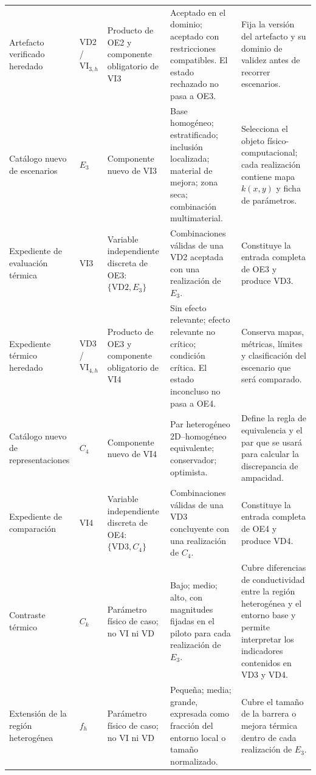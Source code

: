 \documentclass[11pt,a4paper,oneside]{report}
\newcommand{\kx}{k(x,y)}
\begin{document}
\begin{singlespace}
\begin{landscape}
\begin{longtable}{L{3.10cm}L{1.45cm}L{3.00cm}L{5.15cm}L{5.25cm}}
\bottomrule
\endlastfoot

Artefacto verificado heredado & VD2 / $\mathrm{VI}_{3,h}$ & Producto de OE2 y componente obligatorio de VI3 & Aceptado en el dominio; aceptado con restricciones compatibles. El estado rechazado no pasa a OE3. & Fija la versión del artefacto y su dominio de validez antes de recorrer escenarios. \\

Catálogo nuevo de escenarios & $E_3$ & Componente nuevo de VI3 & Base homogéneo; estratificado; inclusión localizada; material de mejora; zona seca; combinación multimaterial. & Selecciona el objeto físico-computacional; cada realización contiene mapa $\kx$ y ficha de parámetros. \\

Expediente de evaluación térmica & VI3 & Variable independiente discreta de OE3: $\{\mathrm{VD2},E_3\}$ & Combinaciones válidas de una VD2 aceptada con una realización de $E_3$. & Constituye la entrada completa de OE3 y produce VD3. \\

Expediente térmico heredado & VD3 / $\mathrm{VI}_{4,h}$ & Producto de OE3 y componente obligatorio de VI4 & Sin efecto relevante; efecto relevante no crítico; condición crítica. El estado inconcluso no pasa a OE4. & Conserva mapas, métricas, límites y clasificación del escenario que será comparado. \\

Catálogo nuevo de representaciones & $C_4$ & Componente nuevo de VI4 & Par heterogéneo 2D--homogéneo equivalente; conservador; optimista. & Define la regla de equivalencia y el par que se usará para calcular la discrepancia de ampacidad. \\

Expediente de comparación & VI4 & Variable independiente discreta de OE4: $\{\mathrm{VD3},C_4\}$ & Combinaciones válidas de una VD3 concluyente con una realización de $C_4$. & Constituye la entrada completa de OE4 y produce VD4. \\

Contraste térmico & $C_k$ & Parámetro físico de caso; no VI ni VD & Bajo; medio; alto, con magnitudes fijadas en el piloto para cada realización de $E_3$. & Cubre diferencias de conductividad entre la región heterogénea y el entorno base y permite interpretar los indicadores contenidos en VD3 y VD4. \\

Extensión de la región heterogénea & $f_h$ & Parámetro físico de caso; no VI ni VD & Pequeña; media; grande, expresada como fracción del entorno local o tamaño normalizado. & Cubre el tamaño de la barrera o mejora térmica dentro de cada realización de $E_3$. \\


\end{longtable}
\end{landscape}
\end{singlespace}
\end{document}
